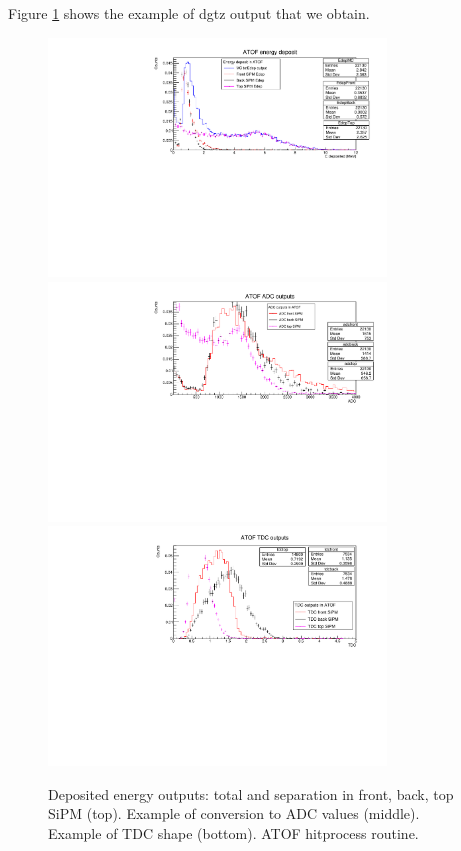 Figure \ref{fig:atof_dgtz} shows the example of dgtz output that we obtain.
\begin{figure}[H]
	\centering
	\includegraphics[width=0.8\textwidth]{ATOF_Edep_dgtzOptions.pdf}
	\includegraphics[width=0.8\textwidth]{ATOF_ADC_dgtzOptions.pdf}
	\includegraphics[width=0.8\textwidth]{ATOF_TDC_dgtzOptions.pdf}
	\caption{Deposited energy outputs: total and separation in front, back, top SiPM (top). Example of conversion to ADC values (middle). Example of TDC shape (bottom). ATOF hitprocess routine.}
	\label{fig:atof_dgtz}
\end{figure}	



